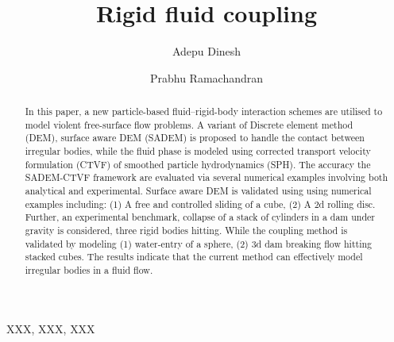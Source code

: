 \documentclass[preprint,12pt]{elsarticle}
\begin{document}
\begin{frontmatter}

  \title{Rigid fluid coupling}
  \author[IITB]{Adepu Dinesh }
   \author[IITB]{Prabhu Ramachandran}
   \address[IITB]{Department of Aerospace
    Engineering, Indian Institute of Technology Bombay, Powai, Mumbai 400076}


\begin{abstract}
  In this paper, a new particle-based fluid–rigid-body interaction schemes are
  utilised to model violent free-surface flow problems. A variant of Discrete
  element method (DEM), surface aware DEM (SADEM) is proposed to handle the
  contact between irregular bodies, while the fluid phase is modeled using
  corrected transport velocity formulation (CTVF) of smoothed particle
  hydrodynamics (SPH). The accuracy the SADEM-CTVF framework are evaluated via
  several numerical examples involving both analytical and experimental.
  Surface aware DEM is validated using using numerical examples including: (1)
  A free and controlled sliding of a cube, (2) A 2d rolling disc. Further, an
  experimental benchmark, collapse of a stack of cylinders in a dam under
  gravity is considered, three rigid bodies hitting. While the coupling method
  is validated by modeling (1) water-entry of a sphere, (2) 3d dam breaking
  flow hitting stacked cubes. The results indicate that the current method can
  effectively model irregular bodies in a fluid flow.
\end{abstract}

\begin{keyword}
{XXX}, {XXX}, {XXX}


\end{keyword}

\end{frontmatter}

\end{document}

